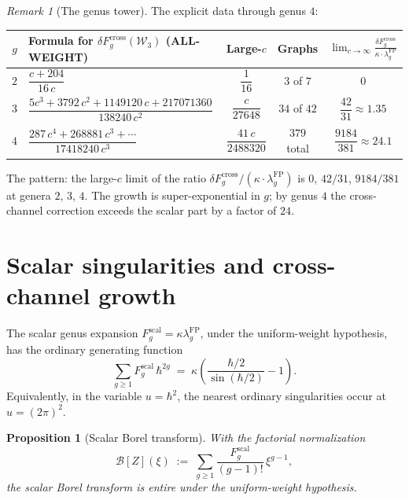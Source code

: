 \documentclass[11pt]{article}
\newtheorem{proposition}[theorem]{Proposition}
\theoremstyle{definition}
\theoremstyle{remark}
\newtheorem{remark}[theorem]{Remark}
\newcommand{\Walg}{\mathcal{W}}
\newcommand{\FP}{\mathrm{FP}}
\newcommand{\cross}{\mathrm{cross}}
\newcommand{\scal}{\mathrm{scal}}
\numberwithin{equation}{section}
\begin{document}
\begin{remark}[The genus tower]\label{rem:genus-tower}
The explicit data through genus $4$:
\begin{center}
\small
\renewcommand{\arraystretch}{1.4}
\begin{tabular}{clccc}
\toprule
$g$ & Formula for
 $\delta F_g^{\cross}(\Walg_3)$ \textup{(ALL-WEIGHT)} &
 Large-$c$ &
 Graphs &
 $\displaystyle\lim_{c \to \infty}
 \frac{\delta F_g^{\cross}}%
 {\kappa \cdot \lambda_g^{\FP}}$ \\
\midrule
$2$ &
 $\dfrac{c + 204}{16\, c}$ &
 $\dfrac{1}{16}$ &
 $3$ of $7$ &
 $0$ \\[10pt]
$3$ &
 $\dfrac{5c^3 {+} 3792\, c^2 {+}
 1149120\, c {+} 217071360}%
 {138240\, c^2}$ &
 $\dfrac{c}{27648}$ &
 $34$ of $42$ &
 $\dfrac{42}{31} \approx 1.35$ \\[10pt]
$4$ &
 $\dfrac{287\, c^4 {+} 268881\, c^3
 {+} \cdots}{17418240\, c^3}$ &
 $\dfrac{41\, c}{2488320}$ &
 $379$ total &
 $\dfrac{9184}{381} \approx 24.1$ \\
\bottomrule
\end{tabular}
\end{center}
The pattern: the large-$c$ limit of the ratio
$\delta F_g^{\cross}/(\kappa \cdot \lambda_g^{\FP})$ is
$0$, $42/31$, $9184/381$ at genera $2$, $3$, $4$.
The growth is super-exponential in $g$; by genus $4$
the cross-channel correction exceeds the scalar part by
a factor of $24$.
\end{remark}


\section{Scalar singularities and cross-channel growth}\label{sec:instanton}

The scalar genus expansion
\(F_g^{\scal}=\kappa\lambda_g^{\FP}\), under the uniform-weight
hypothesis, has the ordinary generating function
\[
 \sum_{g \geq 1} F_g^{\scal}\, \hbar^{2g}
 \;=\;
 \kappa\!\left(
 \frac{\hbar/2}{\sin(\hbar/2)} - 1
 \right).
\]
Equivalently, in the variable \(u=\hbar^2\), the nearest ordinary
singularities occur at \(u=(2\pi)^2\).

\begin{proposition}[Scalar Borel transform]\label{prop:scalar-borel}
With the factorial normalization
\[
 \mathcal{B}[Z](\xi)
 \;:=\;
 \sum_{g \geq 1}
 \frac{F_g^{\scal}}{(g-1)!}\,\xi^{g-1},
\]
the scalar Borel transform is entire under the uniform-weight
hypothesis.
\end{proposition}
\end{document}
